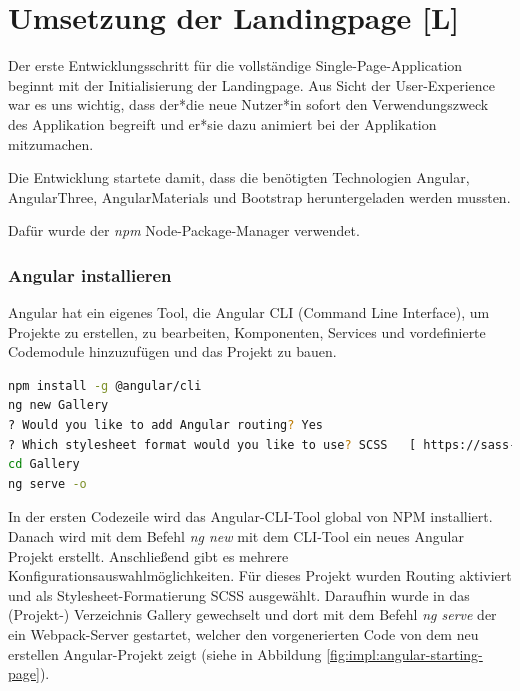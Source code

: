 \section{Umsetzung der Landingpage [L]}

Der erste Entwicklungsschritt für die vollständige Single-Page-Application beginnt mit der Initialisierung der Landingpage. Aus Sicht der User-Experience war es uns wichtig, dass der*die neue Nutzer*in sofort den Verwendungszweck des Applikation begreift und er*sie dazu animiert bei der Applikation mitzumachen. 

Die Entwicklung startete damit, dass die benötigten Technologien Angular, AngularThree, AngularMaterials und Bootstrap heruntergeladen werden mussten.

Dafür wurde der \emph{npm} Node-Package-Manager verwendet.

\subsubsection{Angular installieren}\label{sec:AngularCLI}
Angular hat ein eigenes Tool, die Angular CLI (Command Line Interface), um Projekte zu erstellen, zu bearbeiten, Komponenten, Services und vordefinierte Codemodule hinzuzufügen und das Projekt zu bauen.

\begin{lstlisting}[caption={{Terminalm - Angular aufsetzen, Installation der CLI, Configuration eines neuen Projektes, Starten des Projektes}},language=bash]
npm install -g @angular/cli 
ng new Gallery
? Would you like to add Angular routing? Yes
? Which stylesheet format would you like to use? SCSS   [ https://sass-lang.com/documentation/syntax#scss ]
cd Gallery
ng serve -o
\end{lstlisting}

In der ersten Codezeile wird das Angular-CLI-Tool global von NPM installiert.
Danach wird mit dem Befehl \emph{ng new} mit dem CLI-Tool ein neues Angular Projekt erstellt. Anschließend gibt es mehrere Konfigurationsauswahlmöglichkeiten. Für dieses Projekt wurden Routing aktiviert und  als Stylesheet-Formatierung SCSS ausgewählt. Daraufhin wurde in das (Projekt-) Verzeichnis Gallery gewechselt und dort mit dem Befehl \emph{ng serve} der ein Webpack-Server gestartet, welcher den vorgenerierten Code von dem neu erstellen Angular-Projekt zeigt (siehe in Abbildung \ref{fig:impl:angular-starting-page}). 

